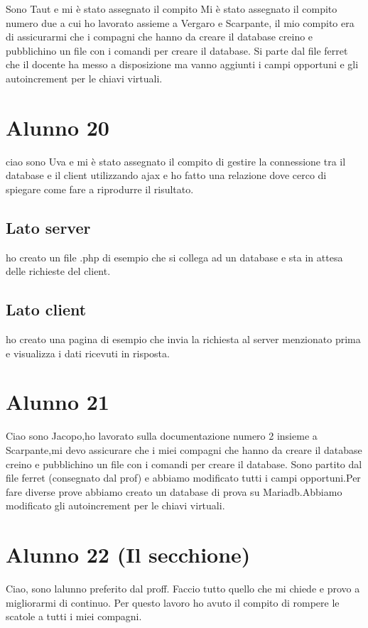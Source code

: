 Sono Taut e mi è stato assegnato il compito Mi è stato assegnato il compito numero due a cui ho lavorato assieme a Vergaro e Scarpante, il mio compito era di assicurarmi che i compagni che hanno da creare il database creino e pubblichino un file con i comandi per creare il database. Si parte dal file ferret che il docente ha messo a disposizione ma vanno aggiunti i campi opportuni e gli autoincrement per le chiavi virtuali. \section*{Alunno 20}

ciao sono Uva e mi è stato assegnato il compito di gestire la connessione tra il database e il client utilizzando ajax e ho fatto una relazione dove cerco di spiegare come fare a riprodurre il risultato. \subsection*{Lato server}

ho creato un file .php di esempio che si collega ad un database e sta in attesa delle richieste del client. \subsection*{Lato client}

ho creato una pagina di esempio che invia la richiesta al server menzionato prima e visualizza i dati ricevuti in risposta. \section*{Alunno 21}

Ciao sono Jacopo,ho lavorato sulla documentazione numero 2 insieme a Scarpante,mi devo assicurare che i miei compagni che hanno da creare il database creino e pubblichino un file con i comandi per creare il database. Sono partito dal file ferret (consegnato dal prof) e abbiamo modificato tutti i campi opportuni.\+Per fare diverse prove abbiamo creato un database di prova su Mariadb.\+Abbiamo modificato gli autoincrement per le chiavi virtuali. \section*{Alunno 22 (Il secchione)}

Ciao, sono l\textquotesingle{}alunno preferito dal proff. Faccio tutto quello che mi chiede e provo a migliorarmi di continuo. Per questo lavoro ho avuto il compito di rompere le scatole a tutti i miei compagni.


